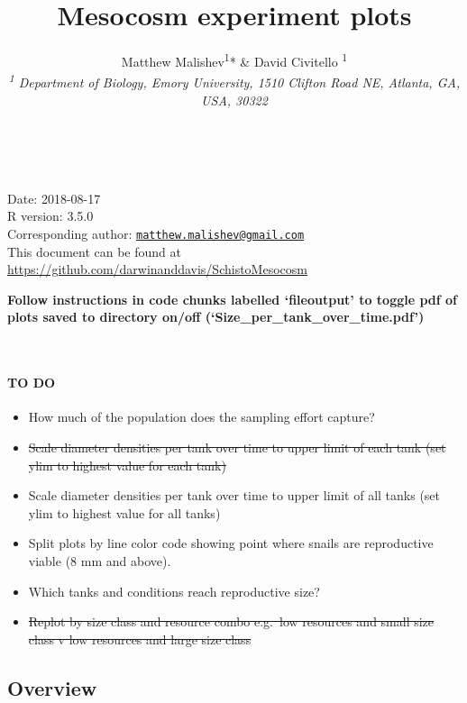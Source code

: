 \documentclass[10,portrait]{article}
\title{Mesocosm experiment plots}
\author{Matthew Malishev\textsuperscript{1}* \& David Civitello
\textsuperscript{1}\\[2\baselineskip]\emph{\textsuperscript{1}
Department of Biology, Emory University, 1510 Clifton Road NE, Atlanta,
GA, USA, 30322}}
\date{}
\providecommand{\tightlist}{%
  \setlength{\itemsep}{0pt}\setlength{\parskip}{0pt}}
\let\oldparagraph\paragraph
\renewcommand{\paragraph}[1]{\oldparagraph{#1}\mbox{}}
\begin{document}
\maketitle

{
\hypersetup{linkcolor=black}
\setcounter{tocdepth}{3}
\tableofcontents
}
~

Date: 2018-08-17\\
R version: 3.5.0\\
Corresponding author:
\href{mailto:matthew.malishev@gmail.com}{\nolinkurl{matthew.malishev@gmail.com}}\\
This document can be found at
\url{https://github.com/darwinanddavis/SchistoMesocosm}

\newpage  

\textbf{Follow instructions in code chunks labelled `fileoutput' to
toggle pdf of plots saved to directory on/off
(`Size\_per\_tank\_over\_time.pdf')}

~

\paragraph{TO DO}\label{to-do}

\begin{itemize}
\tightlist
\item
  How much of the population does the sampling effort capture?
\item
  \sout{Scale diameter densities per tank over time to upper limit of
  each tank (set ylim to highest value for each tank)}\\
\item
  Scale diameter densities per tank over time to upper limit of all
  tanks (set ylim to highest value for all tanks)\\
\item
  Split plots by line color code showing point where snails are
  reproductive viable (8 mm and above).
\item
  Which tanks and conditions reach reproductive size?\\
\item
  \sout{Replot by size class and resource combo e.g.~low resources and
  small size class v low resources and large size class}
\end{itemize}

\subsection{Overview}\label{overview}
\end{document}
